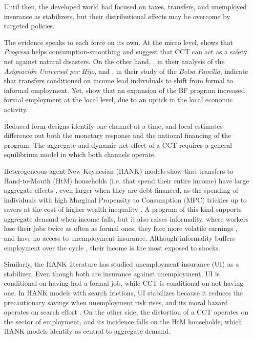 \documentclass[12pt]{article}
\begin{document}
 Until then, the
developed world had focused on taxes, transfers, and unemployed insurance as stabilizers,
but their distributional effects may be overcome by targeted policies.

The evidence speaks to each force on its own. At the micro level, \textcite{uchiyama2019conditional}
shows that \textit{Progresa} helps consumption-smoothing and \textcite{de2006can}
suggest that CCT can act as a safety net against natural disasters. On the other hand,
\textcite{garganta2015impact}, in their analysis of the \textit{Asignación Universal por
Hijo}, and \textcite{de2015bolsa}, in their study of the \textit{Bolsa Família},
indicate that transfers conditioned on income lead individuals to shift from formal
to informal employment. Yet, \textcite{gerard2026cash} show that an expansion of
the BF program increased formal employment at the local level, due to an uptick in
the local economic activity.

Reduced-form designs identify one channel at a time, and local estimates difference
out both the monetary response and the national financing of the program. The aggregate
and dynamic net effect of a CCT requires a general equilibrium model in which both
channels operate.

Heterogeneous-agent New Keynesian (HANK) models show that transfers to
Hand-to-Mouth (HtM) households (i.e. that spend their entire income) have large
aggregate effects \parencite{auclert2024intertemporal}, even larger when they are
debt-financed, as the spending of individuals with high Marginal Propensity to
Consumption (MPC) trickles up to savers at the cost of higher wealth inequality
\parencite{auclert2023trickling}. A program of this kind supports aggregate demand when
income falls, but it also raises informality, where workers lose their jobs twice as
often as formal ones, they face more volatile earnings \parencite{engbom2022earnings},
and have no access to unemployment insurance. Although informality buffers employment
over the cycle \parencite{fernandez2015informal}, their income is the most exposed to
shocks.

Similarly, the HANK literature has studied unemployment insurance (UI) as a stabilizer.
Even though both are insurance against unemployment, UI is conditional on having had a
formal job, while CCT is conditional on not having one. In HANK models with search
frictions, UI stabilizes because it reduces the precautionary savings when unemployment
risk rises, and its moral hazard operates on search effort \parencite{mckay2016role,
kekre2023unemployment,gorn2024assessing,grancini2026welfare}. On the other side, the
distortion of a CCT operates on the sector of employment, and its incidence falls on
the HtM households, which HANK models identify as central to aggregate demand.
\end{document}
